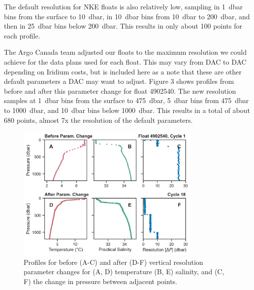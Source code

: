 \documentclass[11pt]{article}
\begin{document}
    The default resolution for NKE floats is also relatively low, sampling in 1~dbar bins from the surface to 10~dbar, in 10~dbar bins from 10~dbar to 200~dbar, and then in 25~dbar bins below 200~dbar. This results in only about 100 points for each profile. 

    The Argo Canada team adjusted our floats to the maximum resolution we could achieve for the data plans used for each float. This may vary from DAC to DAC depending on Iridium costs, but is included here as a note that these are other default parameters a DAC may want to adjust. Figure 3 shows profiles from before and after this parameter change for float 4902540. The new resolution samples at 1~dbar bins from the surface to 475~dbar, 5~dbar bins from 475~dbar to 1000~dbar, and 10~dbar bins below 1000~dbar. This results in a total of about 680 points, almost 7x the resolution of the default parameters. 

    \begin{figure}[ht]
        \centering
        \includegraphics[width=0.8\textwidth]{../figures/meds_before_after_res_results.png}
        \caption{Profiles for before (A-C) and after (D-F) vertical resolution parameter changes for (A, D) temperature (B, E) salinity, and (C, F) the change in pressure between adjacent points.}
    \end{figure}
\end{document}
